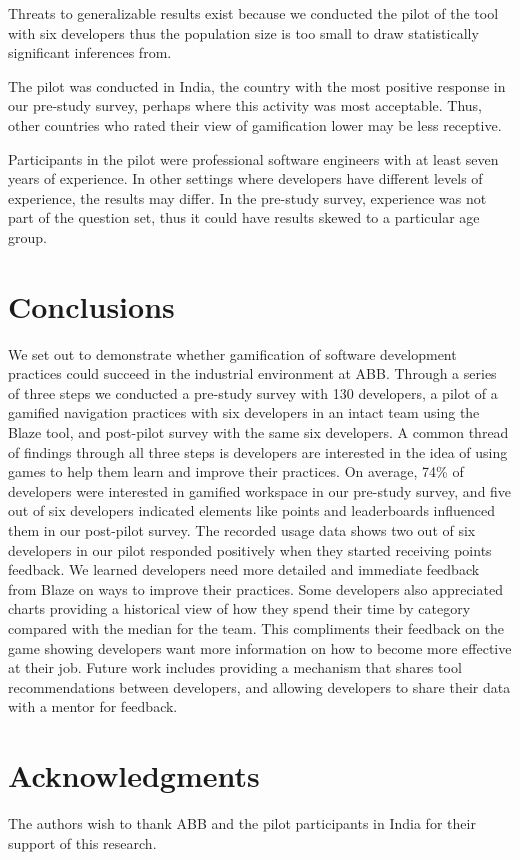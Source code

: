 \documentclass{sig-alternate}
\begin{document}
 Threats to generalizable results exist because we conducted the pilot of the tool with six developers thus the population size is too small to draw statistically significant inferences from. 

 The pilot was conducted in India, the country with the most positive response in our pre-study survey, perhaps where this activity was most acceptable.  Thus, other countries who rated their view of gamification lower may be less receptive. 

Participants in the pilot were professional software engineers with at least seven years of experience.  In other settings where developers have different levels of experience, the results may differ.  In  the pre-study survey, experience was not part of the question set, thus it could have results skewed to a particular age group.

\section{Conclusions}
We set out to demonstrate whether gamification of software development practices could succeed in the industrial environment at ABB.  Through a series of three steps we conducted a pre-study survey with 130 developers, a pilot of a gamified navigation practices with six developers in an intact team using the Blaze tool, and post-pilot survey with the same six developers.  A common thread of findings through all three steps is developers are interested in the idea of using games to help them learn and improve their practices.  On average, 74\% of developers were interested in gamified workspace in our pre-study survey, and five out of six developers indicated elements like points and leaderboards influenced them in our post-pilot survey.  The recorded usage data shows two out of six developers in our pilot responded positively when they started receiving points feedback.  We learned developers need more detailed and immediate feedback from Blaze on ways to improve their practices.  Some developers also appreciated charts providing a historical view of how they spend their time by category compared with the median for the team.  This compliments their feedback on the game showing developers want more information on how to become more effective at their job.  Future work includes providing a mechanism that shares tool recommendations between developers, and allowing developers to share their data with a mentor for feedback.

\section{Acknowledgments}
The authors wish to thank ABB and the pilot participants in India for their support of this research.

%

\balance
 
%
%
\end{document}
